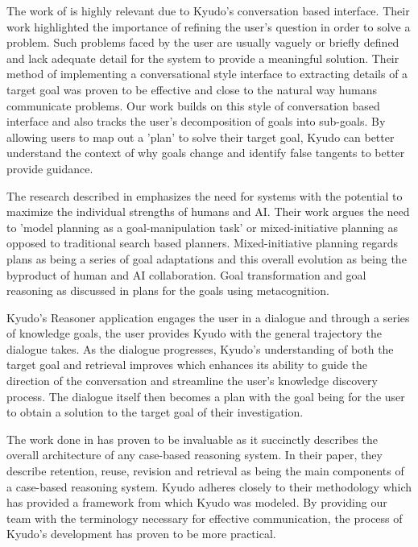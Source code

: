 \documentclass{llncs}
\begin{document}
	The work of \cite{aha_advances_2005} is highly relevant due to Kyudo's conversation based interface. Their work highlighted the importance of refining the user's question in order to solve a problem. Such problems faced by the user are usually vaguely or briefly defined and lack adequate detail for the system to provide a meaningful solution. Their method of implementing a conversational style interface to extracting details of a target goal was proven to be effective and close to the natural way humans communicate problems. Our work builds on this style of conversation based interface and also tracks the user's decomposition of goals into sub-goals. By allowing users to map out a 'plan' to solve their target goal, Kyudo can better understand the context of why goals change and identify false tangents to better provide guidance.
    
    The research described in \cite{cox_mixed-initiative_2007} emphasizes the need for systems with the potential to maximize the individual strengths of humans and AI. Their work argues the need to 'model planning as a goal-manipulation task' or mixed-initiative planning as opposed to traditional search based planners. Mixed-initiative planning regards plans as being a series of goal adaptations \cite{cox_goal_1998} and this overall evolution as being the byproduct of human and AI collaboration. Goal transformation and goal reasoning as discussed in \cite{cox_dannenhauer} plans for the goals using metacognition. 
    
	Kyudo's Reasoner application engages the user in a dialogue and through a series of knowledge goals, the user provides Kyudo with the general trajectory the dialogue takes. As the dialogue progresses, Kyudo's understanding of both the target goal and retrieval improves which enhances \cite{ram_1990} its ability to guide the direction of the conversation and streamline the user's knowledge discovery process. The dialogue itself then becomes a plan with the goal being for the user to obtain a solution to the target goal of their investigation.
    
    The work done in \cite{lopez_de_mantaras_retrieval_2005} has proven to be invaluable as it succinctly describes the overall architecture of any case-based reasoning system. In their paper, they describe retention, reuse, revision and retrieval as being the main components of a case-based reasoning system. Kyudo adheres closely to their methodology which has provided a framework from which Kyudo was modeled. By providing our team with the terminology necessary for effective communication, the process of Kyudo's development has proven to be more practical.
    
\end{document}
